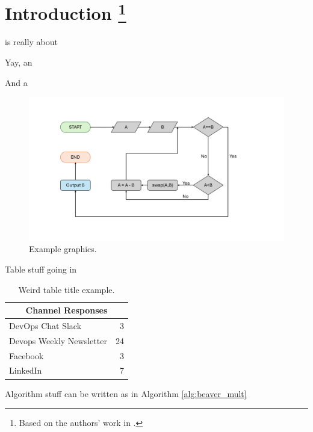 
\chapter[%
    Introduction%
]{%
    Introduction%
    \footnote{
      Based on the authors' work in \cite{Sokolowski2024Automated,Sokolowski2024Pipr}.
    }
}
\label{sec:intro}

 is really about \lipsum[2]

Yay, an  \lipsum[5]

And a  \lipsum[6]

\begin{figure}
  \includegraphics[width=\linewidth]{graphics/example.pdf}
  \caption{Example graphics.}
  \label{fig:example}
\end{figure}

Table stuff going in  \lipsum[6]
\begin{table}
	\caption{Weird table title example.} 
	\label{tab:example}
	\begin{tabular}{lr}
		\toprule
		\multicolumn{2}{c}{Channel \hspace{2cm} Responses} \\ 
		\midrule
		DevOps Chat Slack & 3 \\ 
		Devops Weekly Newsletter & 24  \\ 
		Facebook & 3 \\ 
		LinkedIn & 7 \\ 
		\bottomrule
	\end{tabular}
\end{table}

Algorithm stuff can be written as in Algorithm \ref{alg:beaver_mult} \lipsum[6]

